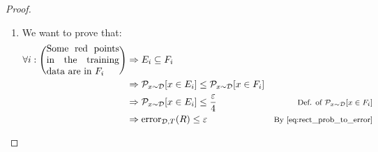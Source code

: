 \begin{theorem}
\begin{proof}
\begin{enumerate}
            \item
                We want to prove that:
                \begin{equation} \label{eq:rect_points_to_error}
                    \begin{aligned}
                        \forall i: \left( \parbox{2.7cm}{Some red points in the training data are in $F_i$} \right) &\Rightarrow
                            E_i \subseteq F_i \\
                            & \Rightarrow \mathcal{P}_{x \sim \mathcal{D}}[x \in E_i] \leq \mathcal{P}_{x \sim \mathcal{D}}[x \in F_i] \\
                            & \Rightarrow \mathcal{P}_{x \sim \mathcal{D}}[x \in E_i] \leq \frac{\varepsilon}{4}
                                & \text{\footnotesize Def. of $\mathcal{P}_{x \sim \mathcal{D}}[x \in F_i]$} \\
                            & \Rightarrow \text{error}_{\mathcal{D}, T}(R) \leq \varepsilon 
                                & \text{\footnotesize By \Cref{eq:rect_prob_to_error}}
                    \end{aligned}    
                \end{equation}
        \end{enumerate}
        

\end{proof}
\end{theorem}
